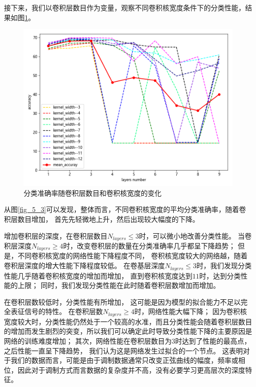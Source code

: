 接下来，我们以卷积层数目作为变量，观察不同卷积核宽度条件下的分类性能，结果如图\ref{fig_5_2}。
\begin{figure}[!h]
	\centering
	\includegraphics[scale=0.6]{figures/chapter_5/fig_5_4}
	\caption{分类准确率随卷积层数目和卷积核宽度的变化}
	\label{fig_5_2}
\end{figure}

从图\ref{fig_5_3}可以发现，整体而言，不同卷积核宽度的平均分类准确率，随着卷积层数目增加，
首先先轻微地上升，然后出现较大幅度的下降。\par

增加卷积层的深度，在卷积层数目$N_{layers} \leq 3$时，可以微小地改善分类性能。
当卷积层深度$N_{layers} \geq 4$时，改变卷积层的数量在分类准确率几乎都呈下降趋势；
但是，不同卷积核宽度的网络性能下降程度不同，
卷积核宽度较大的网络越，随着卷积层深度的增大性能下降程度较低。
在卷基层深度$N_{layers} \leq 3$时，我们发现分类性能几乎随着卷积核宽度的增加而增加，
直到卷积核宽度达到$11$时，达到分类性能的上限；
同时，我们发现分类性能在此时随着卷积层数增加而增加。\par

在卷积层数较低时，分类性能有所增加，
这可能是因为模型的拟合能力不足以完全表征信号的特性。
在卷积层数$N_{layers} \geq 4$时，网络性能大幅下降；
因为卷积核宽度较大时，分类性能仍然处于一个较高的水准，而且分类性能会随着卷积层数目的增加而发生剧烈的突变，所以我们可以确定此时导致分类性能下降的主要原因是网络的训练难度增加；
其次，网络性能在卷积层数目为$3$时达到了性能的最高点，之后性能一直呈下降趋势，
我们认为这是网络发生过拟合的一个节点。
这表明对于我们的数据而言，可能是由于调制数据通常只改变正弦曲线的幅度，频率或相位，因此对于调制方式而言数据的复杂度并不高，没有必要学习更高层次的深度特征。
\par

